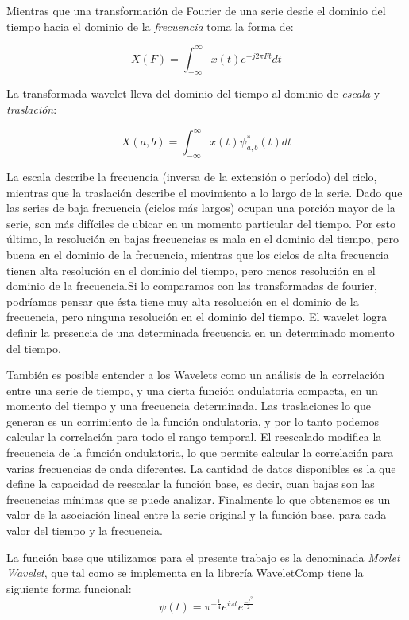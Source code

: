 \documentclass[a4paper]{article}
\begin{document}
Mientras que una transformación de Fourier de una serie desde el dominio del tiempo hacia el dominio de la \textit{frecuencia} toma la forma de:

$$
X(F)=\int_{-\infty}^{\infty} x(t) e^{-j2\pi Ft}dt
$$

La transformada wavelet lleva del dominio del tiempo al dominio de \textit{escala} y \textit{traslación}:

$$
X(a,b)=\int_{-\infty}^{\infty} x(t) \psi^*_{a,b}(t)dt
$$

La escala describe la frecuencia (inversa de la extensión o período) del ciclo, mientras que la traslación describe el movimiento a lo largo de la serie. Dado que las series de baja frecuencia (ciclos más largos) ocupan una porción mayor de la serie, son más difíciles de ubicar en un momento particular del tiempo. Por esto último, la resolución en bajas frecuencias es mala en el dominio del tiempo, pero buena en el dominio de la frecuencia, mientras que los ciclos de alta frecuencia tienen alta resolución en el dominio del tiempo, pero menos resolución en el dominio de la frecuencia.Si lo comparamos con las transformadas de fourier, podríamos pensar que ésta tiene muy alta resolución en el dominio de la frecuencia, pero ninguna resolución en el dominio del tiempo. El wavelet logra definir la presencia de una determinada frecuencia en un determinado momento del tiempo.
 

También es posible entender a los Wavelets como un análisis de la correlación entre una serie de tiempo, y una cierta función ondulatoria compacta, en un momento del tiempo y una frecuencia determinada. Las traslaciones lo que generan es un corrimiento de la función ondulatoria, y por lo tanto podemos calcular la correlación para todo el rango temporal. El reescalado modifica la frecuencia de la función ondulatoria, lo que permite calcular la correlación para varias frecuencias de onda diferentes. La cantidad de datos disponibles es la que define la capacidad de reescalar la función base, es decir, cuan bajas son las frecuencias mínimas que se puede analizar. Finalmente lo que obtenemos es un valor de la asociación lineal entre la serie original y la función base, para cada valor del tiempo y la frecuencia.  

La función base que utilizamos para el presente trabajo es la denominada \textit{Morlet Wavelet}, que tal como se implementa en la librería WaveletComp \citep{Roesch2018} tiene la siguiente forma funcional:
$$
\psi(t)=\pi^{-\frac{1}{4}}e^{i\omega t}e^{\frac{-t^2}{2}}
$$
\end{document}
